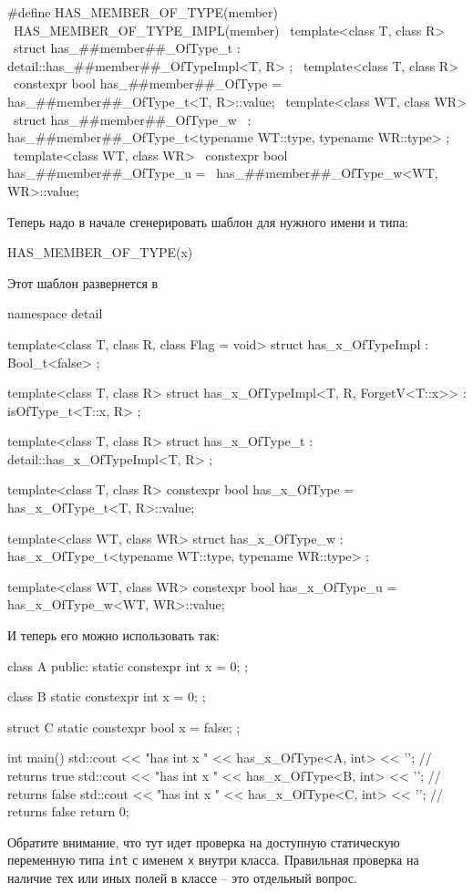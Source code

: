\begin{cppcode}
#define HAS_MEMBER_OF_TYPE(member)                                             \
  HAS_MEMBER_OF_TYPE_IMPL(member)                                              \
  template<class T, class R>                                                   \
  struct has_##member##_OfType_t : detail::has_##member##_OfTypeImpl<T, R> {}; \
  template<class T, class R>                                                   \
  constexpr bool has_##member##_OfType = has_##member##_OfType_t<T, R>::value; \
  template<class WT, class WR>                                                 \
  struct has_##member##_OfType_w                                               \
      : has_##member##_OfType_t<typename WT::type, typename WR::type> {};      \
  template<class WT, class WR>                                                 \
  constexpr bool has_##member##_OfType_u =                                     \
      has_##member##_OfType_w<WT, WR>::value;
\end{cppcode}
Теперь надо в начале сгенерировать шаблон для нужного имени и типа:
\begin{cppcode}
HAS_MEMBER_OF_TYPE(x)                                            
\end{cppcode}
Этот шаблон развернется в
\begin{cppcode}
namespace detail {
template<class T, class R, class Flag = void>
struct has_x_OfTypeImpl : Bool_t<false> {};

template<class T, class R>
struct has_x_OfTypeImpl<T, R, ForgetV<T::x>> : isOfType_t<T::x, R> {};
}

template<class T, class R>
struct has_x_OfType_t : detail::has_x_OfTypeImpl<T, R> {};

template<class T, class R>
constexpr bool has_x_OfType = has_x_OfType_t<T, R>::value;

template<class WT, class WR>
struct has_x_OfType_w : has_x_OfType_t<typename WT::type, typename WR::type> {};

template<class WT, class WR>
constexpr bool has_x_OfType_u = has_x_OfType_w<WT, WR>::value;
\end{cppcode}
И теперь его можно использовать так:
\begin{cppcode}
class A {
public:
  static constexpr int x = 0;
};

class B {
  static constexpr int x = 0;
};

struct C {
  static constexpr bool x = false;
};

int main() {
  std::cout << "has int x " << has_x_OfType<A, int> << '\n';  // returns true
  std::cout << "has int x " << has_x_OfType<B, int> << '\n';  // returns false
  std::cout << "has int x " << has_x_OfType<C, int> << '\n';  // returns false
  return 0;
}
\end{cppcode}
Обратите внимание, что тут идет проверка на доступную статическую переменную типа \verb"int" с именем \verb"x" внутри класса.
Правильная проверка на наличие тех или иных полей в классе -- это отдельный вопрос.

